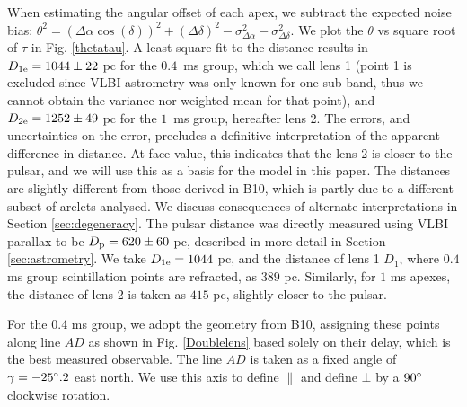 \documentclass[useAMS,usenatbib]{mn2e}
\begin{document}
When estimating the angular offset of each apex,
we subtract the expected noise bias:
${\theta}^2=({\Delta\alpha}\cos(\delta))^2+({\Delta\delta})^2-\sigma^2_{\Delta\alpha}-\sigma^2_{\Delta\delta}$. 
We plot the $\theta$ vs square root of $\tau$ in Fig.
\ref{thetatau}. A least square fit to the distance results in
$D_{1{\rm e}}=1044\pm 22$ pc for the  $0.4$\ ms group, which we call
lens 1 (point 1 is excluded since VLBI astrometry was only known for
one sub-band, thus we cannot obtain the variance nor weighted mean for that point), and
$D_{2{\rm e}} = 1252 \pm 49$ pc for the $1$\ ms group, hereafter lens 2.
The errors, and uncertainties on the error, precludes a definitive
interpretation of the apparent difference in distance.  At face value, 
this indicates that the lens 2 is closer to the pulsar, and we will
use this as a basis for the model in this paper.  
The distances are slightly different from those derived in
B10, which is partly due to a different subset
of arclets analysed. We discuss
consequences of alternate interpretations in Section \ref{sec:degeneracy}.
The pulsar distance was directly measured using VLBI parallax to be
$D_{\rm p} = 620 \pm 60$ pc, described in more detail in Section \ref{sec:astrometry}.  
We take $D_{1{\rm e}}=1044$ pc,  and the distance of lens 1 $D_{1}$,
where $0.4$ ms group scintillation points are refracted, as $389$
pc. Similarly, for $1$ ms apexes, the distance of lens 2 is taken as $415$ pc,
slightly closer to the pulsar.


For the 0.4 ms group, we adopt the geometry from
B10, assigning these points along line $AD$ as
shown in Fig. \ref{Doublelens} based solely on their delay, which is
the best measured observable. The line $AD$ is taken as a
fixed angle of $\gamma=-25\degree.2$ east north. We use this axis
to define ${\parallel}$ and define ${\bot}$ by a $90\degree$ clockwise
rotation.  
\end{document}
